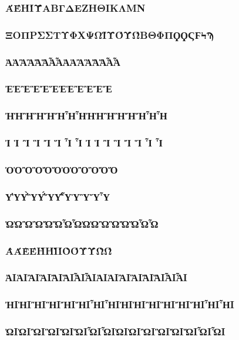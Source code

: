 \documentclass{article}
\begin{document}
  \subsubsection{\MakeUppercase{άέήίΰαβγδεζηθικλμν}}
  \subsubsection{\MakeUppercase{ξοπρςστυφχψωϊϋόύώϐϑϕϖϘϙϛϝϟϡ}}

  \subsubsection{\MakeUppercase{ἀἁἂἃἄἅἆἇἈἉἊἋἌἍἎἏ}}
  \subsubsection{\MakeUppercase{ἐἑἒἓἔἕἘἙἚἛἜἝ}}
  \subsubsection{\MakeUppercase{ἠἡἢἣἤἥἦἧἨἩἪἫἬἭἮἯ}}
  \subsubsection{\MakeUppercase{ἰ ἱ ἲ ἳ ἴ ἵ ἶ ἷ Ἰ Ἱ Ἲ Ἳ Ἴ Ἵ Ἶ Ἷ}}
  \subsubsection{\MakeUppercase{ὀὁὂὃὄὅὈὉὊὋὌὍ}}
  \subsubsection{\MakeUppercase{ὐὑὒὓὔὕὖὗὙὛὝὟ}}
  \subsubsection{\MakeUppercase{ὠὡὢὣὤὥὦὧὨὩὪὫὬὭὮὯ}}
  \subsubsection{\MakeUppercase{ὰάὲέὴήὶίὸόὺύὼώ}}
  \subsubsection{\MakeUppercase{ᾀᾁᾂᾃᾄᾅᾆᾇᾈᾉᾊᾋᾌᾍᾎᾏ}}
  \subsubsection{\MakeUppercase{ᾐᾑᾒᾓᾔᾕᾖᾗᾘᾙᾚᾛᾜᾝᾞᾟ}}
  \subsubsection{\MakeUppercase{ᾠᾡᾢᾣᾤᾥᾦᾧᾨᾩᾪᾫᾬᾭᾮᾯ}}
\end{document}
